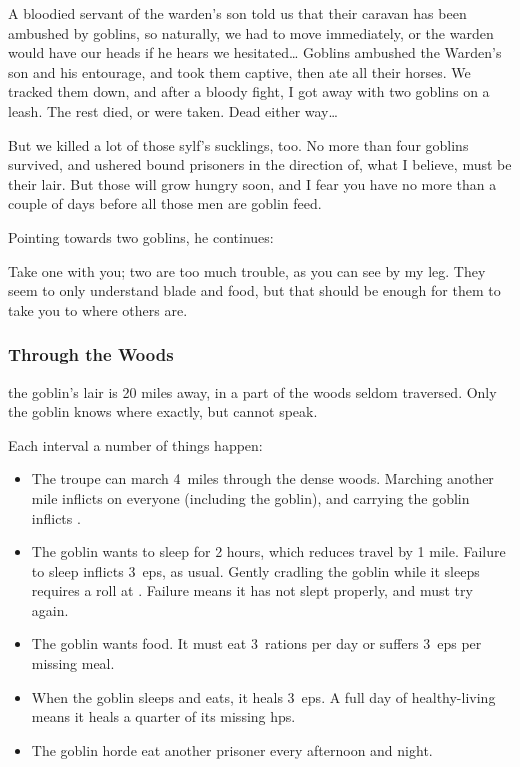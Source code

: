 \documentclass[10pt,twoside]{book}
\begin{document}
\begin{speechtext}
  A bloodied servant of the \gls{warden}'s son told us that their caravan has been ambushed by goblins, so naturally, we had to move immediately, or the warden would have our heads if he hears we hesitated\ldots
  Goblins ambushed the Warden's son and his entourage, and took them captive, then ate all their horses.
  We tracked them down, and after a bloody fight, I got away with two goblins on a leash.
  The rest died, or were taken.
  Dead either way\ldots

  But we killed a lot of those \gls{sylf}'s sucklings, too.
  No more than four goblins survived, and ushered bound prisoners in the direction of, what I believe, must be their lair.
  But those will grow hungry soon, and I fear you have no more than a couple of days before all those men are goblin feed.
\end{speechtext}

Pointing towards two goblins, he continues:

\begin{speechtext}
  Take one with you; two are too much trouble, as you can see by my leg.
  They seem to only understand blade and food, but that should be enough for them to take you to where others are.
\end{speechtext}

\subsubsection{Through the Woods}
the goblin's lair is 20 miles away, in a part of the woods seldom traversed.
Only the goblin knows where exactly, but cannot speak.

%
Each \gls{interval} a number of things happen:

\begin{itemize}
  \item
  The troupe can march 4~miles through the dense woods.
  Marching another mile inflicts  on everyone (including the goblin), and carrying the goblin inflicts .
  \item
  The goblin wants to sleep for 2 hours, which reduces travel by 1 mile.
  Failure to sleep inflicts 3~\glspl{ep}, as usual.
  Gently cradling the goblin while it sleeps requires a  roll at \tn[8].
  Failure means it has not slept properly, and must try again.
  \item
  The goblin wants food.
  It must eat 3~\glspl{ration} per day or suffers 3~\glspl{ep} per missing meal.
  \item
  When the goblin sleeps and eats, it heals 3~\glspl{ep}.
  A full day of healthy-living means it heals a quarter of its missing \glspl{hp}.
  \item
  The goblin horde eat another prisoner every afternoon and night.
\end{itemize}
\end{document}
